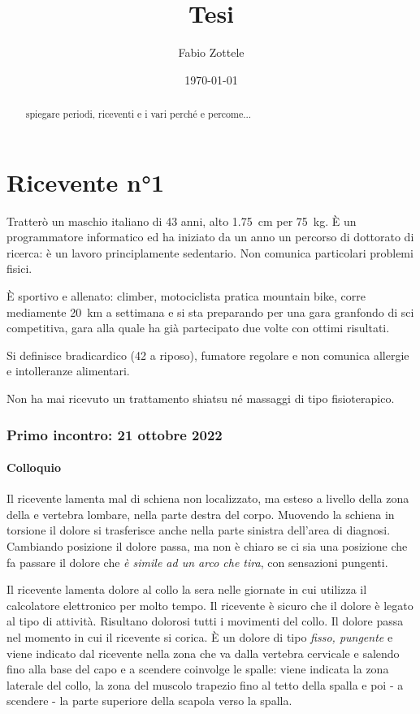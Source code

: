 \documentclass[12pt, openright, twoside]{report}
\newcommand{\RNum}[1]{\uppercase\expandafter{\romannumeral #1\relax}}
\begin{document}
\title{Tesi}
\author{Fabio Zottele}
\date{\today}
\maketitle
\begin{abstract}
spiegare periodi, riceventi e i vari perché e percome...
\end{abstract}
\chapter*{Ricevente n°1}
Tratterò un maschio italiano di 43 anni, alto \SI{1,75}{\centi\metre}
per \SI{75}{\kilogram}. \`{E} un programmatore informatico ed ha iniziato da un
anno un percorso di dottorato di ricerca: è un lavoro principlamente sedentario.
Non comunica particolari problemi fisici.

\`{E} sportivo e allenato: climber, motociclista pratica mountain bike, corre
mediamente \SI{20}{\kilo\metre} a settimana e si sta preparando per una gara
granfondo di sci competitiva, gara alla quale ha già partecipato due volte con
ottimi risultati.

Si definisce bradicardico (\SI{42}{\bpm} a riposo), fumatore regolare
e non comunica allergie e intolleranze alimentari.

Non ha mai ricevuto un trattamento shiatsu né massaggi di tipo fisioterapico.
\subsection*{Primo incontro: 21 ottobre 2022}
\subsubsection{Colloquio}
Il ricevente lamenta mal di schiena non localizzato, ma esteso a livello della
zona della \RNum{1} e \RNum{2} vertebra lombare, nella parte destra del corpo.
Muovendo la schiena in torsione il dolore si trasferisce anche nella parte
sinistra dell'area di diagnosi.
Cambiando posizione il dolore passa, ma non è chiaro se ci sia una posizione che
fa passare il dolore che \textit{è simile ad un arco che tira}, con sensazioni
pungenti.

Il ricevente lamenta dolore al collo la sera nelle giornate in cui utilizza il
calcolatore elettronico per molto tempo.
Il ricevente è sicuro che il dolore è legato al tipo di attività.
Risultano dolorosi tutti i movimenti del collo.
Il dolore passa nel momento in cui il ricevente si corica.
\`{E} un dolore di tipo \textit{fisso, pungente} e viene indicato dal ricevente
nella zona che va dalla \RNum{7} vertebra cervicale e salendo fino alla base del
capo e a scendere coinvolge le spalle: viene indicata la zona laterale del
collo, la zona del muscolo trapezio fino al tetto della spalla e poi - a
scendere - la parte superiore della scapola verso la spalla.
\end{document}
